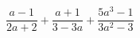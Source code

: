 \begin{ex}[type=expression]
	\begin{condition}
		\( \dfrac{a-1}{2a+2}+\dfrac{a+1}{3-3a}+\dfrac{5a^3-1}{3a^2-3} \)
	\end{condition}
\end{ex}